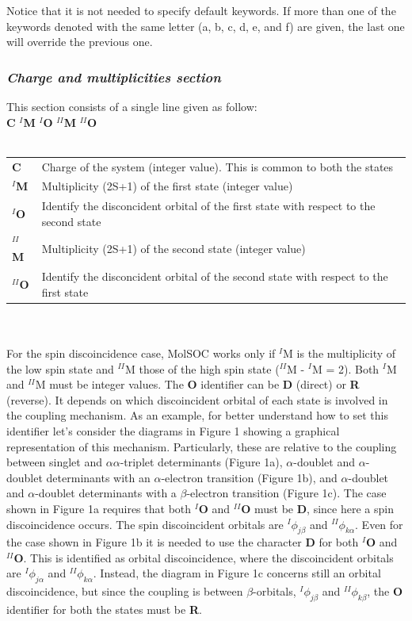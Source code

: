 \documentclass[a4paper,12pt]{article}
\begin{document}
%
Notice that it is not needed to specify default keywords. If more than one of the keywords 
denoted with the same letter (a, b, c, d, e, and f) are given,
the last one will override the previous one.
%
\subsubsection{{\em Charge and multiplicities section}}
This section consists of a single line given as follow: \\
{\bf C} {\bf $^{I}$M} {\bf $^{I}$O} {\bf $^{II}$M} {\bf $^{II}$O} \\ \\
\begin{tabular}{@{}p{3.2 cm}p{12.0 cm}@{}}
{\bf C}          &  Charge of the system (integer value). This is common to both the states \\
{\bf $^{I}$M}    &  Multiplicity (2S+1) of the first state (integer value) \\
{\bf $^{I}$O}    &  Identify the disconcident orbital of the first state with respect 
                    to the second state \\
{\bf $^{II}$M}   &  Multiplicity (2S+1) of the second state (integer value) \\
{\bf $^{II}$O}   &  Identify the disconcident orbital of the second state with respect 
                    to the first state \\
\end{tabular} \\ \\
For the spin discoincidence case, {\sf MolSOC} works only if $^{I}$M is the 
multiplicity of the low spin state and $^{II}$M those of the high spin state 
($^{II}$M - $^{I}$M = 2). Both $^{I}$M and $^{II}$M must be integer values. 
The {\bf O} identifier can be {\bf D} (direct) or {\bf R} (reverse). It 
depends on which discoincident orbital of each state is involved in the coupling mechanism.
As an example, for better understand how to set this identifier let's consider the diagrams in Figure 1 
showing a graphical representation of this mechanism. Particularly, these are relative to 
the coupling between singlet and $\alpha\alpha$-triplet determinants (Figure 1a), 
$\alpha$-doublet and $\alpha$-doublet determinants with an $\alpha$-electron transition (Figure 1b),
and $\alpha$-doublet and $\alpha$-doublet determinants with a $\beta$-electron transition (Figure 1c).
The case shown in Figure 1a requires that both {\bf $^{I}$O} and {\bf $^{II}$O} must be {\bf D}, 
since here a spin discoincidence occurs. The spin discoincident orbitals are 
$^{I}\phi_{j\beta}$ and $^{II}\phi_{k\alpha}$. Even for the case shown in Figure 1b it is needed to 
use the character {\bf D} for both {\bf $^{I}$O} and {\bf $^{II}$O}. 
This is identified as orbital discoincidence, where 
the discoincident orbitals are $^{I}\phi_{j\alpha}$ and $^{II}\phi_{k\alpha}$. Instead, the diagram in
Figure 1c concerns still an orbital discoincidence, but since the coupling is between $\beta$-orbitals,
$^{I}\phi_{j\beta}$ and $^{II}\phi_{k\beta}$, the {\bf O} identifier for both the states must be {\bf R}.
%
\end{document}
